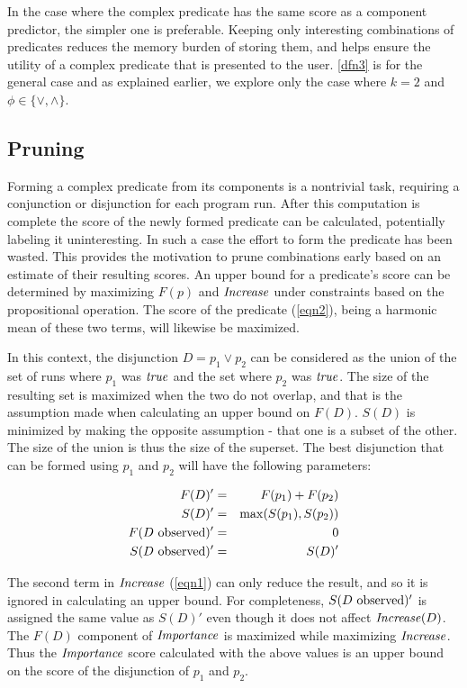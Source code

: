 In the case where the complex predicate has the same score as a component predictor, the simpler one is preferable.  Keeping only interesting combinations of predicates reduces the memory burden of storing them, and helps ensure the utility of a complex predicate that is presented to the user.  \autoref{dfn3} is for the general case and as explained earlier, we explore only the case where $k = 2$ and $\phi \in \{\vee, \wedge\}$.

\subsection{Pruning}
\label{sec-pruning}
Forming a complex predicate from its components is a nontrivial task, requiring a conjunction or disjunction for each program run.  After this computation is complete the score of the newly formed predicate can be calculated, potentially labeling it uninteresting.  In such a case the effort to form the predicate has been wasted.  This provides the motivation to prune combinations early based on an estimate of their resulting scores.  An upper bound for a predicate's score can be determined by maximizing $F(p)$ and $\mathit{Increase}$ under constraints based on the propositional operation.  The score of the predicate (\autoref{eqn2}), being a harmonic mean of these two terms, will likewise be maximized.

In this context, the disjunction $D = p_1 \vee p_2$ can be considered as the union of the set of runs where $p_1$ was $\mathit{true}$ and the set where $p_2$ was $\mathit{true}$.  The size of the resulting set is maximized when the two do not overlap, and that is the assumption made when calculating an upper bound on $F(D)$.  $S(D)$ is minimized by making the opposite assumption - that one is a subset of the other.  The size of the union is thus the size of the superset.  The best disjunction that can be formed using $p_1$ and $p_2$ will have the following parameters:

\begin{eqnarray*}
  F(D)' &=&  F(p_1) + F(p_2) \\
  S(D)' &=&  \max(S(p_1),S(p_2)) \\
  F(\text{$D$ observed})' &=& 0 \\
  S(\text{$D$ observed})' &=& S(D)'
\end{eqnarray*}

The second term in $\mathit{Increase}$ (\autoref{eqn1}) can only reduce the result, and so it is ignored in calculating an upper bound.  For completeness, $S(\text{$D$ observed})'$ is assigned the same value as $S(D)'$ even though it does not affect $\mathit{Increase}(D)$.  The $F(D)$ component of $\mathit{Importance}$ is maximized while maximizing $\mathit{Increase}$.  Thus the $\mathit{Importance}$ score calculated with the above values is an upper bound on the score of the disjunction of $p_1$ and $p_2$.

